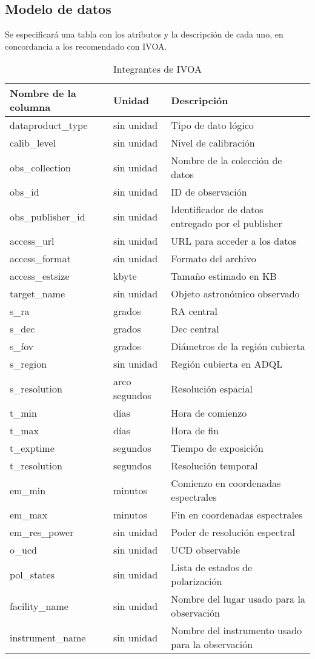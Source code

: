 \subsection{Modelo de datos}

Se especificará una tabla con los atributos y la descripción de cada uno, en
concordancia a los recomendado con IVOA.

\begin{table}[h!t]
	\centering
	\begin{tabular}{|l|l|l|} 
		\hline
		Nombre de la columna & Unidad & Descripción \\
		\hline
		dataproduct\_type & sin unidad & Tipo de dato lógico \\
		calib\_level & sin unidad & Nivel de calibración \\
		obs\_collection & sin unidad & Nombre de la colección de datos \\
		obs\_id & sin unidad & ID de observación \\
		obs\_publisher\_id & sin unidad & Identificador de datos entregado por el publisher \\
		access\_url & sin unidad & URL para acceder a los datos \\
		access\_format & sin unidad & Formato del archivo \\
		access\_estsize & kbyte & Tamaño estimado en KB \\
		target\_name & sin unidad & Objeto astronómico observado \\
		s\_ra & grados & RA central \\
		s\_dec & grados & Dec central \\
		s\_fov & grados & Diámetros de la región cubierta \\
		s\_region & sin unidad & Región cubierta en ADQL \\
		s\_resolution & arco segundos & Resolución espacial \\
		t\_min & días & Hora de comienzo \\
		t\_max & días & Hora de fin \\
		t\_exptime & segundos & Tiempo de exposición \\
		t\_resolution & segundos & Resolución temporal \\
		em\_min & minutos & Comienzo en coordenadas espectrales \\
		em\_max & minutos & Fin en coordenadas espectrales \\
		em\_res\_power & sin unidad & Poder de resolución espectral \\
		o\_ucd & sin unidad & UCD observable \\
		pol\_states & sin unidad & Lista de estados de polarización \\
		facility\_name & sin unidad & Nombre del lugar usado para la observación \\
		instrument\_name & sin unidad & Nombre del instrumento usado para la observación \\
		\hline
	\end{tabular}
	\caption{Integrantes de IVOA}
	\label{table:tap_column_name}
\end{table}

